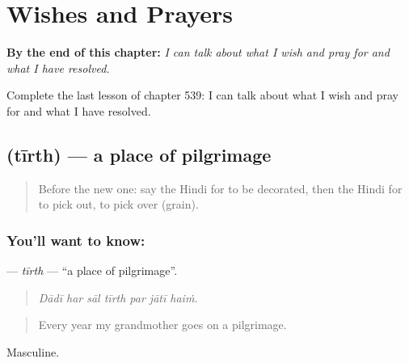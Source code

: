 
\chapter{Wishes and Prayers}
\label{ch:hi-wishes-and-prayers}

\begin{chapteropening}
\textbf{By the end of this chapter:} \emph{I can talk about what I wish and pray for and what I have resolved.}

Complete the last lesson of chapter 539: I can talk about what I wish and pray for and what I have resolved.
\end{chapteropening}

\section[\texorpdfstring{\hi{तीर्थ} (tīrth)}{तीर्थ (tīrth)}]{ (tīrth) — a place of pilgrimage}

\label{lesson:HI-C539-tirth}



\begin{quote}
Before the new one: say the Hindi for to be decorated, then the Hindi for to pick out, to pick over (grain).
\end{quote}

\subsection*{You'll want to know: }
\textbf{} — \emph{tīrth} — \textquotedblleft{}a place of pilgrimage\textquotedblright{}.

\begin{quote}
      
\end{quote}

\begin{quote}
\emph{Dādī har sāl tīrth par jātī haiṁ.}
\end{quote}

\begin{quote}
Every year my grandmother goes on a pilgrimage.
\end{quote}

Masculine.

